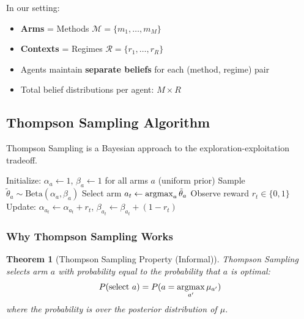 \documentclass[11pt,a4paper]{article}
\theoremstyle{definition}
\theoremstyle{plain}
\newtheorem{theorem}{Theorem}[section]
\newcommand{\argmax}{\operatornamewithlimits{argmax}}
\begin{document}
\begin{keypoint}
In our setting:
\begin{itemize}
    \item \textbf{Arms} = Methods $\mathcal{M} = \{m_1, \ldots, m_M\}$
    \item \textbf{Contexts} = Regimes $\mathcal{R} = \{r_1, \ldots, r_R\}$
    \item Agents maintain \textbf{separate beliefs} for each (method, regime) pair
    \item Total belief distributions per agent: $M \times R$
\end{itemize}
\end{keypoint}

\subsection{Thompson Sampling Algorithm}

Thompson Sampling is a Bayesian approach to the exploration-exploitation tradeoff.

\begin{algorithm}[H]
\caption{Thompson Sampling for Bernoulli Bandits}
\label{alg:thompson}
\begin{algorithmic}[1]
\STATE Initialize: $\alpha_a \gets 1$, $\beta_a \gets 1$ for all arms $a$ (uniform prior)
        \STATE Sample $\tilde{\theta}_a \sim \text{Beta}(\alpha_a, \beta_a)$
    \ENDFOR
    \STATE Select arm $a_t \gets \argmax_a \tilde{\theta}_a$
    \STATE Observe reward $r_t \in \{0, 1\}$
    \STATE Update: $\alpha_{a_t} \gets \alpha_{a_t} + r_t$, \quad $\beta_{a_t} \gets \beta_{a_t} + (1 - r_t)$
\ENDFOR
\end{algorithmic}
\end{algorithm}

\subsubsection{Why Thompson Sampling Works}

\begin{theorem}[Thompson Sampling Property (Informal)]
Thompson Sampling selects arm $a$ with probability equal to the probability that $a$ is optimal:
\begin{equation}
P(\text{select } a) = P(a = \argmax_{a'} \mu_{a'})
\end{equation}
where the probability is over the posterior distribution of $\mu$.
\end{theorem}
\end{document}
